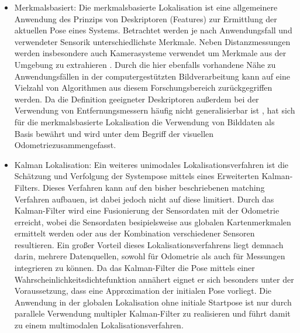 \begin{itemize}
\item Merkmalsbasiert: Die merkmalsbasierte Lokalisation ist eine allgemeinere Anwendung des Prinzips von Deskriptoren (Features) zur Ermittlung der aktuellen Pose eines Systems. Betrachtet werden je nach Anwendungsfall und verwendeter Sensorik unterschiedlichste Merkmale. Neben Distanzmessungen \cite{Tomono2004} werden insbesondere auch Kamerasysteme verwendet um Merkmale aus der Umgebung zu extrahieren \cite{Se2001}. Durch die hier ebenfalls vorhandene Nähe zu Anwendungsfällen in der computergestützten Bildverarbeitung kann auf eine Vielzahl von Algorithmen aus diesem Forschungsbereich zurückgegriffen werden. Da die Definition geeigneter Deskriptoren außerdem bei der Verwendung von Entfernungsmessern häufig nicht generalisierbar ist \red[belegen!?], hat sich für die merkmalsbasierte Lokalisation die Verwendung von Bilddaten als Basis bewährt und wird unter dem Begriff der visuellen Odometrie\red[Fußnote o.a.] zusammengefasst.\\

\item Kalman Lokalisation: Ein weiteres unimodales Lokalisationsverfahren ist die Schätzung und Verfolgung der Systempose mittels eines Erweiterten Kalman-Filters. Dieses Verfahren kann auf den bisher beschriebenen matching Verfahren aufbauen, ist dabei jedoch nicht auf diese limitiert. Durch das Kalman-Filter wird eine Fusionierung der Sensordaten mit der Odometrie erreicht, wobei die Sensordaten besipielsweise aus globalen Kartenmerkmalen ermittelt werden \cite{Leonard1991} oder aus der Kombination verschiedener Sensoren \cite{Roumeliotis1997} resultieren. Ein großer Vorteil dieses Lokalisationsverfahrens liegt demnach darin, mehrere Datenquellen, sowohl für Odometrie als auch für Messungen integrieren zu können. Da das Kalman-Filter die Pose mittels einer Wahrscheinlichkeitsdichtefunktion annähert eignet er sich besonders unter der Voraussetzung, dass eine Approximation der initialen Pose vorliegt. Die Anwendung in der globalen Lokalisation ohne initiale Startpose ist nur durch parallele Verwendung multipler Kalman-Filter zu realisieren und führt damit zu einem multimodalen Lokalisationsverfahren.
\end{itemize}
